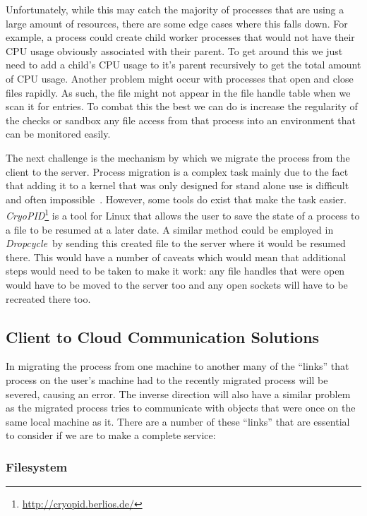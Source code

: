 \documentclass[12pt, a4paper]{article}
\def\dropcycle{\emph{Dropcycle}\ }
\begin{document}
Unfortunately, while this may catch the majority of processes that are using
a large amount of resources, there are some edge cases where this falls down.
For example, a process could create child worker processes that would not have
their CPU usage obviously associated with their parent. To get around this we
just need to add a child's CPU usage to it's parent recursively to get the
total amount of CPU usage. Another problem might occur with processes that open
and close files rapidly. As such, the file might not appear in the file handle
table when we scan it for entries. To combat this the best we can do is
increase the regularity of the checks or sandbox any file access from that
process into an environment that can be monitored easily.

The next challenge is the mechanism by which we migrate the process from the
client to the server. Process migration is a complex task mainly due to the
fact that adding it to a kernel that was only designed for stand alone use is
difficult and often impossible~\cite{Milojicic1999}. However, some tools do
exist that make the task easier.
\emph{CryoPID}\footnote{\url{http://cryopid.berlios.de/}} is a tool for Linux
that allows the user to save the state of a process to a file to be resumed at
a later date. A similar method could be employed in \dropcycle by sending this
created file to the server where it would be resumed there. This would have
a number of caveats which would mean that additional steps would need to be
taken to make it work: any file handles that were open would have to be moved
to the server too and any open sockets will have to be recreated there too.

\subsection{Client to Cloud Communication Solutions}

In migrating the process from one machine to another many of the ``links'' that
process on the user's machine had to the recently migrated process will be
severed, causing an error. The inverse direction will also have a similar
problem as the migrated process tries to communicate with objects that were
once on the same local machine as it. There are a number of these ``links''
that are essential to consider if we are to make a complete service:

\subsubsection{Filesystem}
\end{document}
